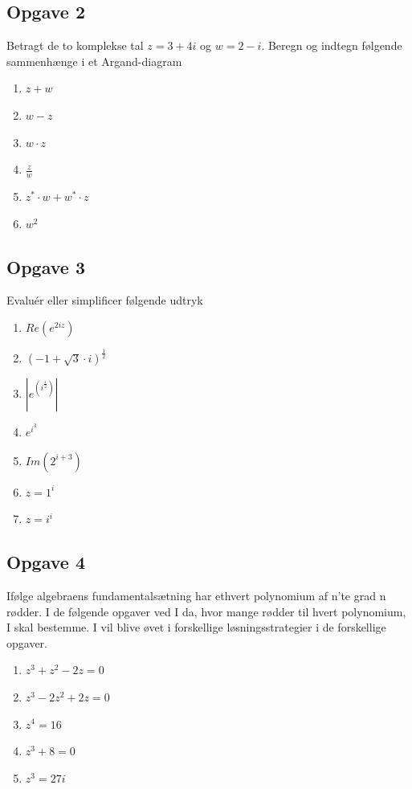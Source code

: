 \documentclass[a4paper, 12pt,titlepage]{article}
\begin{document}
\subsection*{Opgave 2}
\label{sec:org77d15c0}
Betragt de to komplekse tal \(z=3+4i\) og \(w=2-i\). Beregn og indtegn følgende sammenhænge i et Argand-diagram

\begin{enumerate}
\item \(z+w\)
\item \(w-z\)
\item \(w \cdot z\)
\item \(\frac{z}{w}\)
\item \(z^* \cdot w + w^*\cdot z\)
\item \(w^2\)
\end{enumerate}

\subsection*{Opgave 3}
\label{sec:org15b9ebb}
Evaluér eller simplificer følgende udtryk

\begin{enumerate}
\item \(Re\left(e^{2 i z}\right)\)
\item \(\left(-1 + \sqrt{3} \cdot i\right)^{\frac{1}{2}}\)
\item \(\left \lvert e^{\left(i^\frac{1}{2}\right)}\right\rvert\)
\item \(e^{i^3}\)
\item \(Im\left(2^{i+3}\right)\)
\item \(z=1^i\)
\item \(z=i^i\)
\end{enumerate}
\subsection*{Opgave 4}
\label{sec:orgda36f5b}
Ifølge algebraens fundamentalsætning har ethvert polynomium af n'te grad n rødder. I de følgende opgaver ved I da, hvor mange rødder til hvert polynomium, I skal bestemme. I vil blive øvet i forskellige løsningsstrategier i de forskellige opgaver.

\begin{enumerate}
\item \(z^3+z^2-2z =0\)
\item \(z^3-2z^2+2z =0\)
\item \(z^4 =16\)
\item \(z^3+8=0\)
\item \(z^3=27i\)
\end{enumerate}
\end{document}
